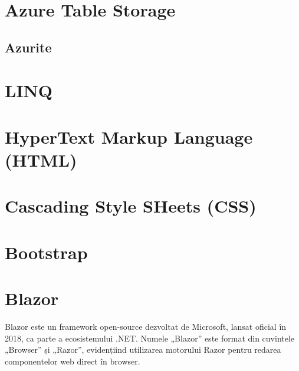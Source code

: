 \section{Azure Table Storage}
\subsection{Azurite}
\section{LINQ}
\section{HyperText Markup Language (HTML)}
\section{Cascading Style SHeets (CSS)}
\section{Bootstrap}
\section{Blazor}
Blazor este un framework open-source dezvoltat de Microsoft, lansat oficial în 2018, ca parte a ecosistemului .NET. Numele „Blazor” este format din cuvintele „Browser” și „Razor”, evidențiind utilizarea motorului Razor pentru redarea componentelor web direct în browser. \parencite{blazor}

